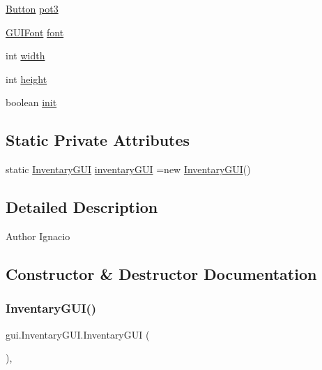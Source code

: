 \begin{DoxyCompactItemize}
\item 
\mbox{\hyperlink{classgui_1_1_button}{Button}} \mbox{\hyperlink{classgui_1_1_inventary_g_u_i_a6f8ebe66408f36f669c699c6ca288153}{pot3}}
\item 
\mbox{\hyperlink{classgui_1_1_g_u_i_font}{G\+U\+I\+Font}} \mbox{\hyperlink{classgui_1_1_inventary_g_u_i_af1ff6aac1b74999c92c27981d7220837}{font}}
\item 
int \mbox{\hyperlink{classgui_1_1_inventary_g_u_i_a454d17df015be6ca0956ef602564be44}{width}}
\item 
int \mbox{\hyperlink{classgui_1_1_inventary_g_u_i_ad1560d70585e4b32cd613f5e1767e9ac}{height}}
\item 
boolean \mbox{\hyperlink{classgui_1_1_inventary_g_u_i_a49c7773a4aeb02c46640af69f5f10b15}{init}}
\end{DoxyCompactItemize}
\subsection*{Static Private Attributes}
\begin{DoxyCompactItemize}
\item 
static \mbox{\hyperlink{classgui_1_1_inventary_g_u_i}{Inventary\+G\+UI}} \mbox{\hyperlink{classgui_1_1_inventary_g_u_i_ac73cfdba888b575728293d9f780f3514}{inventary\+G\+UI}} =new \mbox{\hyperlink{classgui_1_1_inventary_g_u_i}{Inventary\+G\+UI}}()
\end{DoxyCompactItemize}


\subsection{Detailed Description}
\begin{DoxyAuthor}{Author}
Ignacio 
\end{DoxyAuthor}


\subsection{Constructor \& Destructor Documentation}
\mbox{\label{classgui_1_1_inventary_g_u_i_aef89de77a50cd8f064bd17700951715b}} 
\subsubsection{\texorpdfstring{Inventary\+G\+U\+I()}{InventaryGUI()}}
{\footnotesize\ttfamily gui.\+Inventary\+G\+U\+I.\+Inventary\+G\+UI (\begin{DoxyParamCaption}{ }\end{DoxyParamCaption})\hspace{0.3cm}{\ttfamily [inline]}, {\ttfamily [private]}}


